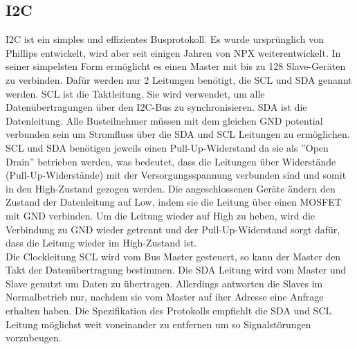 \subsection{I2C}
I2C ist ein simples und effizientes Busprotokoll.
Es wurde ursprünglich von Phillips entwickelt, wird aber seit einigen Jahren von NPX weiterentwickelt.
In seiner simpelsten Form ermöglicht es einen Master mit bis zu 128 Slave-Geräten zu verbinden.
Dafür werden nur 2 Leitungen benötigt, die SCL und SDA genannt werden. SCL ist die Taktleitung. Sie wird verwendet, um alle Datenübertragungen über den I2C-Bus zu synchronisieren. SDA ist die Datenleitung.
Alle Busteilnehmer müssen mit dem gleichen GND potential verbunden sein um Stromfluss über die SDA und SCL Leitungen zu ermöglichen\cite{i2b-bus_org}.\\
SCL und SDA benötigen jeweils einen Pull-Up-Widerstand da sie als ”Open Drain” betrieben werden, was bedeutet, dass die Leitungen über Widerstände (Pull-Up-Widerstände) mit der Versorgungsspannung verbunden sind und somit in den High-Zustand gezogen werden.
Die angeschlossenen Geräte ändern den Zustand der Datenleitung auf Low, indem sie die Leitung über einen MOSFET mit GND verbinden.
Um die Leitung wieder auf High zu heben, wird die Verbindung zu GND wieder getrennt und der Pull-Up-Widerstand sorgt dafür, dass die Leitung wieder im High-Zustand ist.\\
Die Clockleitung SCL wird vom Bus Master gesteuert, so kann der Master den Takt der Datenübertragung bestimmen.
Die SDA Leitung wird vom Master und Slave genutzt um Daten zu übertragen. Allerdings antworten die Slaves im Normalbetrieb nur, nachdem sie vom Master auf iher Adresse eine Anfrage erhalten haben. 
Die Spezifikation des Protokolls\cite{nxp_com} empfiehlt die SDA und SCL Leitung möglichst weit voneinander zu entfernen um so Signalstörungen vorzubeugen.


